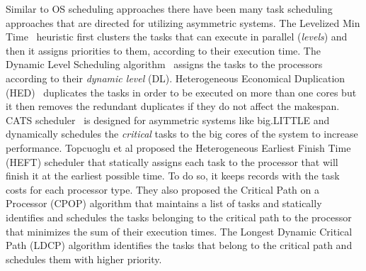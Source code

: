 
Similar to OS scheduling approaches there have been many task scheduling approaches that are directed for utilizing asymmetric systems.
The Levelized Min Time~\cite{Hetero95} heuristic first clusters the tasks that can execute in parallel (\textit{levels}) and then it assigns priorities to them, according to their execution time.
The Dynamic Level Scheduling algorithm~\cite{Hetero93} assigns the tasks to the processors according to their \textit{dynamic level} (DL).
Heterogeneous Economical Duplication (HED)~\cite{Dup09} duplicates the tasks in order to be executed on more than one cores but it then
removes the redundant duplicates if they do not affect the makespan. 
CATS scheduler~\cite{Chronaki:ICS2015} is designed for asymmetric systems like big.LITTLE and dynamically schedules the \textit{critical} tasks to the big cores of the system to increase performance. 
Topcuoglu et al proposed the Heterogeneous Earliest Finish Time (HEFT) scheduler that statically assigns each task to the processor that will finish it at the earliest possible time. To do so, it keeps records with the task costs for each processor type.
They also proposed the Critical Path on a Processor (CPOP) algorithm \cite{HEFT} that maintains a list of tasks and statically identifies and schedules the tasks belonging to the critical path  to the processor that minimizes the sum of their execution times. 
The Longest Dynamic Critical Path (LDCP) algorithm \cite{LDCP} identifies the tasks that belong to the critical path and schedules them with higher priority.

